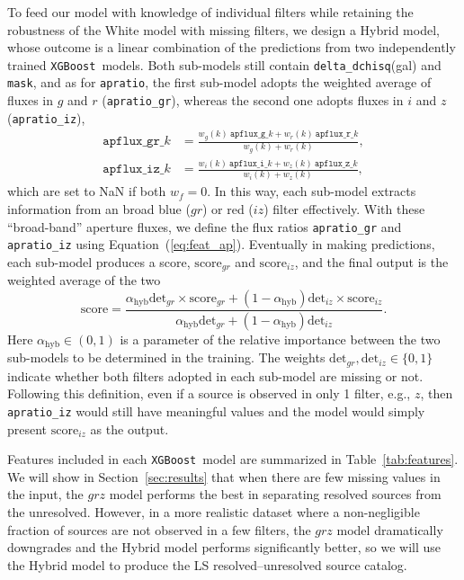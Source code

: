 \documentclass[twocolumn,tighten]{aastex631}
\newcommand{\xgboost}{\texttt{XGBoost}}
\begin{document}
\begin{CJK*}{UTF8}{gbsn}
To feed our model with knowledge of individual filters while retaining the robustness of the White model with missing filters, we design a Hybrid model, whose outcome is a linear combination of the predictions from two independently trained \xgboost\ models. Both sub-models still contain \texttt{delta\_dchisq}(gal) and \texttt{mask}, and as for \texttt{apratio}, the first sub-model adopts the weighted average of fluxes in $g$ and $r$ (\texttt{apratio\_gr}), whereas the second one adopts fluxes in $i$ and $z$ (\texttt{apratio\_iz}),
\begin{equation}\label{eq:apflux_hybrid}
\begin{aligned}
    \texttt{apflux\_gr}\_k &= \frac{w_g(k) \ \texttt{apflux\_g}\_k + w_r(k) \ \texttt{apflux\_r}\_k}{w_g(k) + w_r(k)},\\
    \texttt{apflux\_iz}\_k &= \frac{w_i(k) \ \texttt{apflux\_i}\_k + w_z(k) \ \texttt{apflux\_z}\_k}{w_i(k) + w_z(k)},
\end{aligned}
\end{equation}
which are set to NaN if both $w_f=0$. In this way, each sub-model extracts information from an broad blue ($gr$) or red ($iz$) filter effectively. With these ``broad-band'' aperture fluxes, we define the flux ratios \texttt{apratio\_gr} and \texttt{apratio\_iz} using Equation~(\ref{eq:feat_ap}). Eventually in making predictions, each sub-model produces a score, $\mathrm{score}_{gr}$ and $\mathrm{score}_{iz}$, and the final output is the weighted average of the two
\begin{equation}\label{eq:score_hybrid}
    \mathrm{score} = \frac{\alpha_\mathrm{hyb}\mathrm{det}_{gr}\times\mathrm{score}_{gr} + (1 - \alpha_\mathrm{hyb})\mathrm{det}_{iz}\times\mathrm{score}_{iz}}{\alpha_\mathrm{hyb}\mathrm{det}_{gr} + (1 - \alpha_\mathrm{hyb})\mathrm{det}_{iz}}.
\end{equation}
Here $\alpha_\mathrm{hyb}\in(0,1)$ is a parameter of the relative importance between the two sub-models to be determined in the training. The weights $\mathrm{det}_{gr}, \mathrm{det}_{iz}\in\{0, 1\}$ indicate whether both filters adopted in each sub-model are missing or not. Following this definition, even if a source is observed in only 1 filter, e.g., $z$, then \texttt{apratio\_iz} would still have meaningful values and the model would simply present $\mathrm{score}_{iz}$ as the output.

Features included in each \xgboost\ model are summarized in Table~\ref{tab:features}. We will show in Section~\ref{sec:results} that when there are few missing values in the input, the $grz$ model performs the best in separating resolved sources from the unresolved. However, in a more realistic dataset where a non-negligible fraction of sources are not observed in a few filters, the $grz$ model dramatically downgrades and the Hybrid model performs significantly better, so we will use the Hybrid model to produce the LS resolved--unresolved source catalog.


\end{CJK*}
\end{document}
